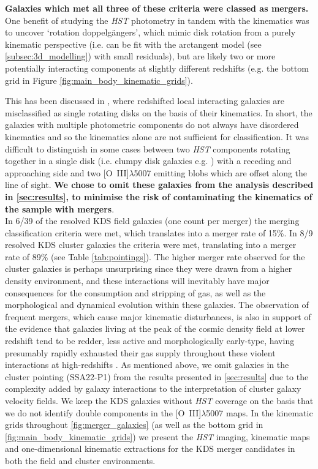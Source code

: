 \documentclass[fleqn,usenatbib]{mnras}
\begin{document}
\textbf{Galaxies which met all three of these criteria were classed as mergers.}
One benefit of studying the {\em HST} photometry in tandem with the kinematics was to uncover `rotation doppelg{\"a}ngers', which mimic disk rotation from a purely kinematic perspective (i.e. can be fit with the arctangent model (see \cref{subsec:3d_modelling}) with small residuals), but are likely two or more potentially interacting components at slightly different redshifts (e.g. the bottom grid in Figure \ref{fig:main_body_kinematic_grids}).

This has been discussed in \cite{Hung2015}, where redshifted local interacting galaxies are misclassified as single rotating disks on the basis of their kinematics. 
In short, the galaxies with multiple photometric components do not always have disordered kinematics and so the kinematics alone are not sufficient for classification.
It was difficult to distinguish in some cases between two {\em HST} components rotating together in a single disk (i.e. clumpy disk galaxies e.g. \citealt{Elmegreen2004,Bournaud2007,ForsterSchreiber2009}) with a receding and approaching side and two [O~{\sc III}]$\lambda$5007 emitting blobs which are offset along the line of sight.
\textbf{We chose to omit these galaxies from the analysis described in \cref{sec:results}, to minimise the risk of contaminating the kinematics of the sample with mergers}. \\

In 6/39 of the resolved KDS field galaxies (one count per merger) the merging classification criteria were met, which translates into a merger rate of 15\%.
In 8/9 resolved KDS cluster galaxies the criteria were met, translating into a merger rate of 89\%  (see Table \ref{tab:pointings}).
The higher merger rate observed for the cluster galaxies is perhaps unsurprising since they were drawn from a higher density environment, and these interactions will inevitably have major consequences for the consumption and stripping of gas, as well as the morphological and dynamical evolution within these galaxies.
The observation of frequent mergers, which cause major kinematic disturbances, is also in support of the evidence that galaxies living at the peak of the cosmic density field at lower redshift tend to be redder, less active and morphologically early-type, having presumably rapidly exhausted their gas supply throughout these violent interactions at high-redshifts \citep[e.g.][]{Steidel1998,White2007,Kodama2007,Zheng2009}.
As mentioned above, we omit galaxies in the cluster pointing (SSA22-P1) from the results presented in \cref{sec:results} due to the complexity added by galaxy interactions to the interpretation of cluster galaxy velocity fields.
We keep the KDS galaxies without {\em HST} coverage on the basis that we do not identify double components in the [O~{\sc III}]$\lambda$5007 maps. 
In the kinematic grids throughout \ref{fig:merger_galaxies} (as well as the bottom grid in \ref{fig:main_body_kinematic_grids}) we present the {\em HST} imaging, kinematic maps and one-dimensional kinematic extractions for the KDS merger candidates in both the field and cluster environments.
\end{document}

